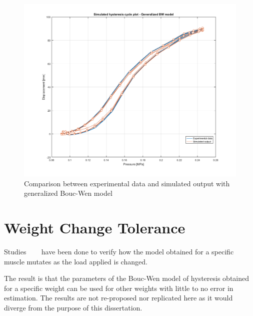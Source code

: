 \begin{figure}[H]
	\centering
	\includegraphics[width=\linewidth]{Images/comparison_general}
	\caption{Comparison between experimental data and simulated output with generalized Bouc-Wen model}
	\label{fig:comp_gener}
\end{figure}


\section{Weight Change Tolerance}

Studies~\cite{kobayashi2014displacement}~\cite{kobayashi2015displacement}
~\cite{kobayashi2013development} have been done to verify how the model
obtained for a specific muscle mutates as the load applied is changed. 

The result is that the parameters of the Bouc-Wen model of hysteresis
obtained for a specific weight can be used for other weights with little to no
error in estimation. The results are not re-proposed nor replicated here
as it would diverge from the purpose of this dissertation.
